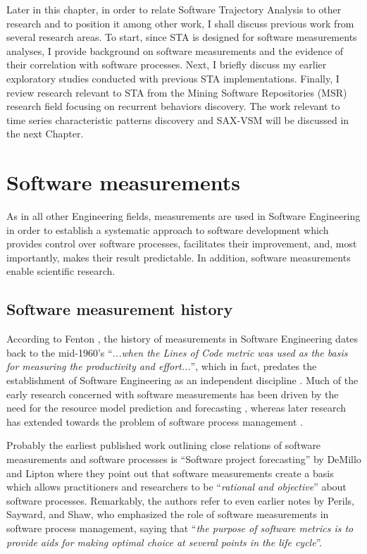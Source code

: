 Later in this chapter, in order to relate Software Trajectory Analysis to other research and to position 
it among other work, I shall discuss previous work from several research areas.
To start, since STA is designed for software measurements analyses, I provide background on software 
measurements and the evidence of their correlation with software processes. 
Next, I briefly discuss my earlier exploratory studies conducted with previous STA implementations. 
Finally, I review research relevant to STA from the Mining Software Repositories (MSR) research field 
focusing on recurrent behaviors discovery.
The work relevant to time series characteristic patterns discovery and SAX-VSM will be discussed 
in the next Chapter.

\section{Software measurements}
As in all other Engineering fields, measurements are used in Software Engineering in order to establish a 
systematic approach to software development which provides control over software processes, facilitates
their improvement, and, most importantly, makes their result predictable. 
In addition, software measurements enable scientific research.

\subsection{Software measurement history}
According to Fenton \cite{citeulike:1525462}, the history of measurements in Software Engineering dates 
back to the mid-1960's  ``\textit{...when the Lines of Code metric was used as the basis for measuring the 
productivity and effort...}'', which in fact, predates the establishment of Software Engineering as an 
independent discipline \cite{naur_crisis_68}. 
Much of the early research concerned with software measurements has been driven by the need for the resource model 
prediction and forecasting \cite{citeulike:1525462}, whereas later research has extended towards the problem 
of software process management \cite{citeulike:13158802}.

Probably the earliest published work outlining close relations of software measurements and software 
processes is ``Software project forecasting'' by DeMillo and Lipton \cite{demillo1980software} where they 
point out that software measurements create a basis which allows practitioners and researchers to be 
``\textit{rational and objective}'' about software processes. 
Remarkably, the authors refer to even earlier notes by Perils, Sayward, and Shaw, who emphasized the role of software 
measurements in software process management, saying that ``\textit{the purpose of software metrics is 
to provide aids for making optimal choice at several points in the life cycle}''.

